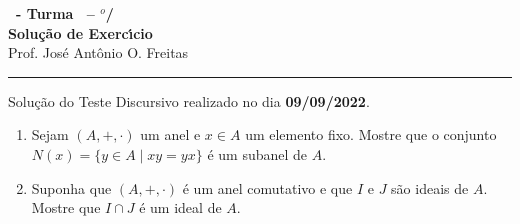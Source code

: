 \documentclass[12pt]{exam}
\begin{document}
    \begin{center}
        {\Large\bf \disciplina\ - Turma \turma\ -- \semestre$^{o}$/\ano} \\ \vspace{9pt} {\large\bf
        Solu\c{c}\~ao de Exerc{\'\i}cio}\\
        \vspace{9pt} Prof. Jos{\'e} Ant{\^o}nio O. Freitas
    \end{center}
    \hrule

    \vspace{.6cm}

    Solu\c{c}\~ao do Teste Discursivo realizado no dia \textbf{09/09/2022}.

    \vspace{.6cm}

    \questao{}
        \begin{enumerate}[label={\arabic*})]
            \item Sejam $(A, +, \cdot)$ um anel e $x \in A$ um elemento fixo. Mostre que o conjunto $N(x) = \{y \in A \mid xy = yx \}$ é um subanel de $A$.

            \item Suponha que $(A, +, \cdot)$ é um anel comutativo e que $I$ e $J$ são ideais de $A$. Mostre que $I \cap J$ é um ideal de $A$.
        \end{enumerate}
\end{document}
